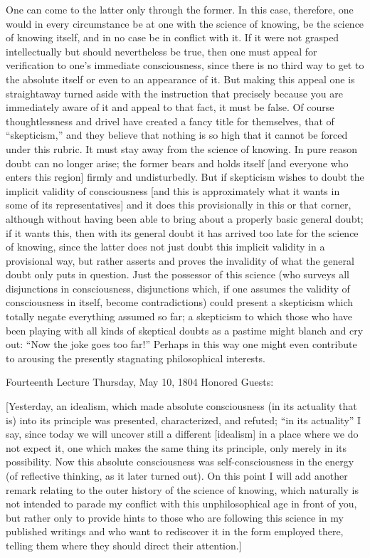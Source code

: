 One can come to the latter only through the former.
In this case, therefore, one would in every circumstance
be at one with the science of knowing,
be the science of knowing itself,
and in no case be in conflict with it.
If it were not grasped intellectually
but should nevertheless be true,
then one must appeal for verification
to one's immediate consciousness,
since there is no third way to get to the absolute itself
or even to an appearance of it.
But making this appeal one is straightaway turned aside
with the instruction that precisely because you are
immediately aware of it and appeal to that fact,
it must be false.
Of course thoughtlessness and drivel have
created a fancy title for themselves,
that of “skepticism,” and they believe that nothing is
so high that it cannot be forced under this rubric.
It must stay away from the science of knowing.
In pure reason doubt can no longer arise;
the former bears and holds itself
[and everyone who enters this region]
firmly and undisturbedly.
But if skepticism wishes to doubt
the implicit validity of consciousness
[and this is approximately what it
wants in some of its representatives]
and it does this provisionally in this or that corner,
although without having been able to bring about
a properly basic general doubt;
if it wants this, then with its general doubt
it has arrived too late for the science of knowing,
since the latter does not just doubt
this implicit validity in a provisional way,
but rather asserts and proves the invalidity of
what the general doubt only puts in question.
Just the possessor of this science
(who surveys all disjunctions in consciousness,
disjunctions which, if one assumes the validity
of consciousness in itself, become contradictions)
could present a skepticism which totally negate
everything assumed so far;
a skepticism to which those who have been playing
with all kinds of skeptical doubts as a pastime
might blanch and cry out: “Now the joke goes too far!”
Perhaps in this way one might even contribute
to arousing the presently stagnating philosophical interests.

Fourteenth Lecture
Thursday, May 10, 1804
Honored Guests:

[Yesterday, an idealism, which made absolute consciousness
(in its actuality that is) into its principle was
presented, characterized, and refuted;
“in its actuality” I say,
since today we will uncover still
a different [idealism] in a place
where we do not expect it,
one which makes the same thing its principle,
only merely in its possibility.
Now this absolute consciousness was self-consciousness
in the energy (of reflective thinking, as it later turned out).
On this point I will add another remark
relating to the outer history of the science of knowing,
which naturally is not intended to parade my conflict
with this unphilosophical age in front of you,
but rather only to provide hints to those
who are following this science in my published writings
and who want to rediscover it in the form employed there,
telling them where they should direct their attention.]


